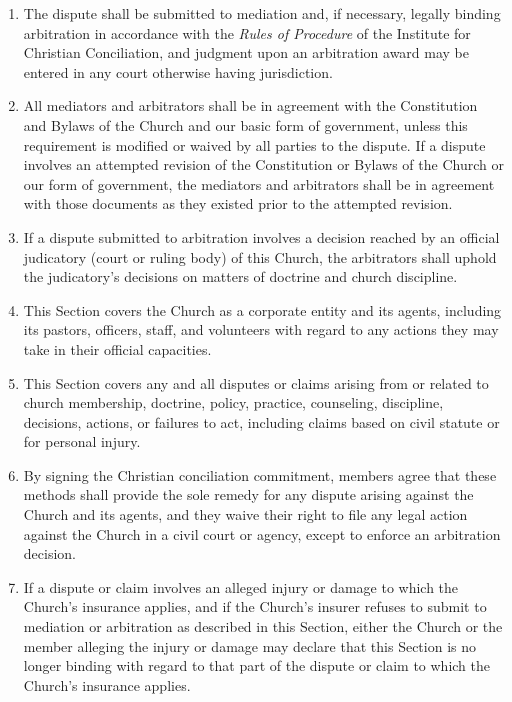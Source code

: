 \documentclass[
]{book}
\providecommand{\tightlist}{%
  \setlength{\itemsep}{0pt}\setlength{\parskip}{0pt}}
\begin{document}
\begin{enumerate}
  \begin{enumerate}
  \def\labelenumii{(\arabic{enumii})}
  \tightlist
  \item
    The dispute shall be submitted to mediation and, if necessary, legally binding arbitration in accordance with the \emph{Rules of Procedure} of the Institute for Christian Conciliation, and judgment upon an arbi­tra­tion award may be entered in any court otherwise having jurisdiction.
  \item
    All mediators and arbitrators shall be in agreement with the Constitution and Bylaws of the Church and our basic form of government, unless this requirement is modified or waived by all parties to the dispute. If a dispute involves an attempted revision of the Constitution or Bylaws of the Church or our form of government, the mediators and arbitrators shall be in agreement with those documents as they existed prior to the attempted revision.
  \item
    If a dispute submitted to arbitration involves a decision reached by an official judicatory (court or ruling body) of this Church, the arbitrators shall uphold the judicatory's decisions on matters of doctrine and church discipline.
  \item
    This Section covers the Church as a corporate entity and its agents, including its pastors, officers, staff, and volunteers with regard to any actions they may take in their official capacities.
  \item
    This Section covers any and all disputes or claims arising from or related to church membership, doctrine, policy, practice, counseling, discipline, decisions, actions, or failures to act, including claims based on civil statute or for personal injury.
  \item
    By signing the Christian conciliation commitment, members agree that these methods shall provide the sole remedy for any dispute arising against the Church and its agents, and they waive their right to file any legal action against the Church in a civil court or agency, except to enforce an arbitration decision.
  \item
    If a dispute or claim involves an alleged injury or damage to which the Church's insurance applies, and if the Church's insurer refuses to submit to mediation or arbitration as described in this Section, either the Church or the member alleging the injury or damage may declare that this Section is no longer binding with regard to that part of the dispute or claim to which the Church's insurance applies.
  \end{enumerate}
\end{enumerate}
\end{document}
